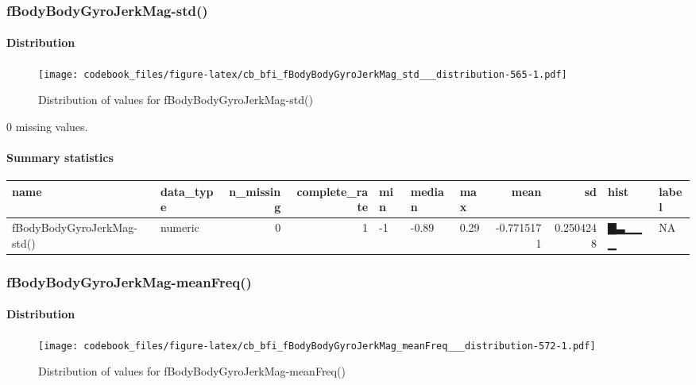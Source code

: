 \documentclass[
]{article}
\begin{document}
\hypertarget{fBodyBodyGyroJerkMag_std__}{%
\subsubsection{fBodyBodyGyroJerkMag-std()}\label{fBodyBodyGyroJerkMag_std__}}

\hypertarget{fBodyBodyGyroJerkMag_std___distribution}{%
\paragraph{Distribution}\label{fBodyBodyGyroJerkMag_std___distribution}}

\begin{figure}
\centering
\texttt{[image: codebook\_files/figure-latex/cb\_bfi\_fBodyBodyGyroJerkMag\_std\_\_\_distribution-565-1.pdf]}
\caption{Distribution of values for fBodyBodyGyroJerkMag-std()}
\end{figure}

0 missing values.

\hypertarget{fBodyBodyGyroJerkMag_std___summary}{%
\paragraph{Summary
statistics}\label{fBodyBodyGyroJerkMag_std___summary}}

\begin{longtable}[]{@{}llrrlllrrll@{}}
\toprule
name & data\_type & n\_missing & complete\_rate & min & median & max &
mean & sd & hist & label \\
\midrule
\endhead
fBodyBodyGyroJerkMag-std() & numeric & 0 & 1 & -1 & -0.89 & 0.29 &
-0.7715171 & 0.2504248 & ▇▃▁▁▁ & NA \\
\bottomrule
\end{longtable}

\hypertarget{fBodyBodyGyroJerkMag_meanFreq__}{%
\subsubsection{fBodyBodyGyroJerkMag-meanFreq()}\label{fBodyBodyGyroJerkMag_meanFreq__}}

\hypertarget{fBodyBodyGyroJerkMag_meanFreq___distribution}{%
\paragraph{Distribution}\label{fBodyBodyGyroJerkMag_meanFreq___distribution}}

\begin{figure}
\centering
\texttt{[image: codebook\_files/figure-latex/cb\_bfi\_fBodyBodyGyroJerkMag\_meanFreq\_\_\_distribution-572-1.pdf]}
\caption{Distribution of values for fBodyBodyGyroJerkMag-meanFreq()}
\end{figure}
\end{document}
